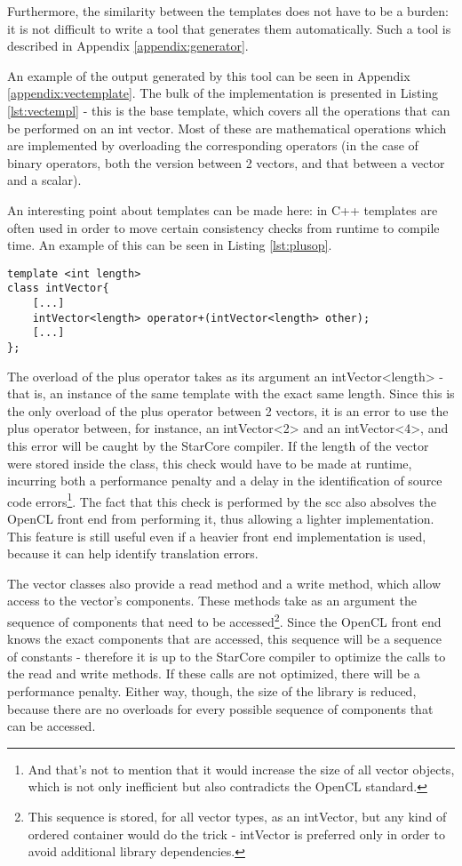 Furthermore, the similarity between the templates does not have to be a burden: it is not difficult to write a tool that generates them automatically. Such a tool is described in Appendix \ref{appendix:generator}.

An example of the output generated by this tool can be seen in Appendix \ref{appendix:vectemplate}. The bulk of the implementation is presented in Listing \ref{lst:vectempl} - this is the base template, which covers all the operations that can be performed on an int vector. Most of these are mathematical operations which are implemented by overloading the corresponding operators (in the case of binary operators, both the version between 2 vectors, and that between a vector and a scalar). 

An interesting point about templates can be made here: in C++ templates are often used in order to move certain consistency checks from runtime to compile time. An example of this can be seen in Listing \ref{lst:plusop}.

\begin{lstlisting}[label=lst:plusop, caption=Signature of the plus operator]
template <int length>
class intVector{
	[...]
	intVector<length> operator+(intVector<length> other);
	[...]
};
\end{lstlisting}

The overload of the plus operator takes as its argument an intVector<length> - that is, an instance of the same template with the exact same length. Since this is the only overload of the plus operator between 2 vectors, it is an error to use the plus operator between, for instance, an intVector<2> and an intVector<4>, and this error will be caught by the StarCore compiler. If the length of the vector were stored inside the class, this check would have to be made at runtime, incurring both a performance penalty and a delay in the identification of source code errors\footnote{And that's not to mention that it would increase the size of all vector objects, which is not only inefficient but also contradicts the OpenCL standard.}. The fact that this check is performed by the scc also absolves the OpenCL front end from performing it, thus allowing a lighter implementation. This feature is still useful even if a heavier front end implementation is used, because it can help identify translation errors.

The vector classes also provide a read method and a write method, which allow access to the vector's components. These methods take as an argument the sequence of components that need to be accessed\footnote{This sequence is stored, for all vector types, as an intVector, but any kind of ordered container would do the trick - intVector is preferred only in order to avoid additional library dependencies.}. Since the OpenCL front end knows the exact components that are accessed, this sequence will be a sequence of constants - therefore it is up to the StarCore compiler to optimize the calls to the read and write methods. If these calls are not optimized, there will be a performance penalty. Either way, though, the size of the library is reduced, because there are no overloads for every possible sequence of components that can be accessed.


